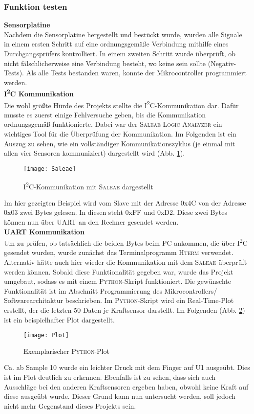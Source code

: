 \documentclass[
	letterpaper, %
	10pt, %
]{CSUniSchoolLabReport}
\begin{document}
\begin{spacing}{1.6}
\subsubsection{Funktion testen}
\textbf{Sensorplatine\\}
Nachdem die Sensorplatine hergestellt und bestückt wurde, wurden alle Signale in einem ersten Schritt auf eine ordnungsgemäße Verbindung mithilfe eines Durchgangsprüfers kontrolliert. In einem zweiten Schritt wurde überprüft, ob nicht fälschlicherweise eine Verbindung besteht, wo keine sein sollte (\glqq Negativ-Tests\grqq). Als alle Tests bestanden waren, konnte der Mikrocontroller programmiert werden.\\

\textbf{I\textsuperscript{2}C Kommunikation\\}
Die wohl größte Hürde des Projekts stellte die I\textsuperscript{2}C-Kommunikation dar. Dafür musste es zuerst einige Fehlversuche geben, bis die Kommunikation ordnungsgemäß funktionierte. Dabei war der \textsc{Saleae Logic Analyzer} ein wichtiges Tool für die Überprüfung der Kommunikation. Im Folgenden ist ein Auszug zu sehen, wie ein vollständiger Kommunikationszyklus (je einmal mit allen vier Sensoren kommuniziert) dargestellt wird (Abb. \ref{fig:Saleae}).
\begin{figure}[H]
    \centering
    \texttt{[image: Saleae]}
    \caption{I\textsuperscript{2}C-Kommunikation mit \textsc{Saleae} dargestellt}
    \label{fig:Saleae}
\end{figure}
Im hier gezeigten Beispiel wird vom Slave mit der Adresse 0x4C von der Adresse 0x03 zwei Bytes gelesen. In diesen steht 0xFF und 0xD2. Diese zwei Bytes können nun über UART an den Rechner gesendet werden.\\

\textbf{UART Kommunikation\\}
Um zu prüfen, ob tatsächlich die beiden Bytes beim PC ankommen, die über I\textsuperscript{2}C gesendet wurden, wurde zunächst das Terminalprogramm \textsc{Hterm} verwendet. Alternativ hätte auch hier wieder die Kommunikation mit dem \textsc{Saleae} überprüft werden können. Sobald diese Funktionalität gegeben war, wurde das Projekt umgebaut, sodass es mit einem \textsc{Python}-Skript funktioniert. Die gewünschte Funktionalität ist im Abschnitt \glqq Programmierung des Mikrocontrollers/ Softwarearchitaktur\grqq $ $ beschrieben. Im \textsc{Python}-Skript wird ein Real-Time-Plot erstellt, der die letzten 50 Daten je Kraftsensor darstellt. Im Folgenden (Abb. \ref{fig:Plot}) ist ein beispielhafter Plot dargestellt.
\begin{figure}[H]
    \centering
    \texttt{[image: Plot]}
    \caption{Exemplarischer \textsc{Python}-Plot}
    \label{fig:Plot}
\end{figure}
Ca. ab Sample 10 wurde ein leichter Druck mit dem Finger auf U1 ausgeübt. Dies ist im Plot deutlich zu erkennen. Ebenfalls ist zu sehen, dass sich auch Ausschläge bei den anderen Kraftsensoren ergeben haben, obwohl keine Kraft auf diese ausgeübt wurde. Dieser Grund kann nun untersucht werden, soll jedoch nicht mehr Gegenstand dieses Projekts sein.



\end{spacing}
\end{document}
